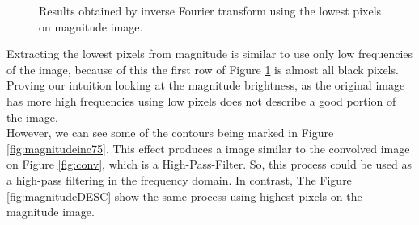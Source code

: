\documentclass[12pt,a4paper]{article}
\begin{document}
\begin{itemize}
\begin{figure}[!h]
{{			}
			\label{fig:magnitudeinc50}
		}
		\quad
		
		\caption{Results obtained by inverse Fourier transform using the lowest pixels on magnitude image.}
		\label{fig:magnitudeINC}
	\end{figure}
		
	Extracting the lowest pixels from magnitude is similar to use only low frequencies of the image, because of this the first row of Figure \ref{fig:magnitudeINC} is almost all black pixels. Proving our intuition looking at the magnitude brightness, as the original image has more high frequencies using low pixels does not describe a good portion of the image. \\
	
	However, we can see some of the contours being marked in Figure \ref{fig:magnitudeinc75}. This effect produces a image similar to the convolved image on Figure \ref{fig:conv}, which is a High-Pass-Filter. So, this process could be used as a high-pass filtering in the frequency domain. In contrast, The Figure \ref{fig:magnitudeDESC} show the same process using highest pixels on the magnitude image. \\
	

\end{itemize}
\end{document}

